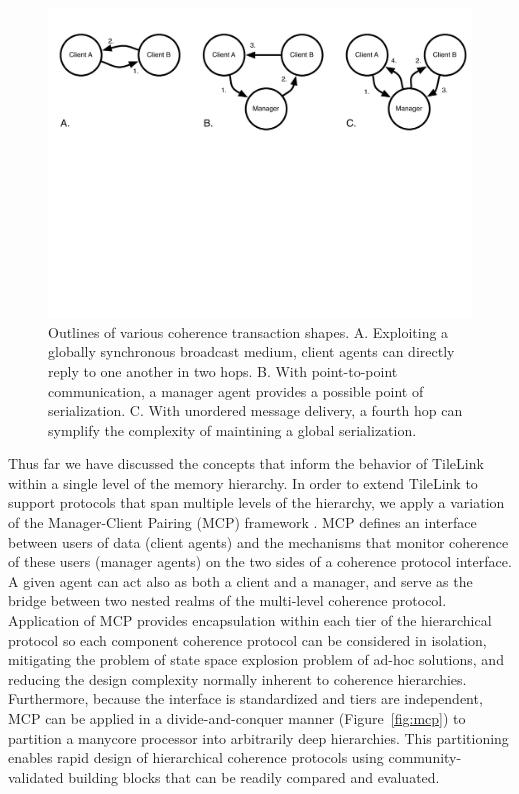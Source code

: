 \begin{figure}[t!]
\centering
\includegraphics[width=1\columnwidth]{tilelink/figures/hops.pdf}
\caption{Outlines of various coherence transaction shapes.
A. Exploiting a globally synchronous broadcast medium, client agents can directly reply to one another in two hops.
B. With point-to-point communication, a manager agent provides a possible point of serialization.
C. With unordered message delivery, a fourth hop can symplify the complexity of maintining a global serialization.
}
\label{fig:hops}
\end{figure}

Thus far we have discussed the concepts that inform the behavior of TileLink within a single level of the memory hierarchy.
In order to extend TileLink to support protocols that span multiple levels of the hierarchy, we apply a variation of the Manager-Client Pairing (MCP) framework \cite{beu2011manager}.
MCP defines an interface between users of data (client agents) and the mechanisms that monitor coherence of these users (manager agents) on the two sides of a coherence protocol interface.
A given agent can act also as both a client and a manager, and serve as the bridge between two nested realms of the multi-level coherence protocol.
Application of MCP provides
encapsulation within each tier of the hierarchical protocol so each
component coherence protocol can be considered in isolation,
mitigating the problem of state space explosion problem of ad-hoc
solutions, and reducing the design complexity normally inherent
to coherence hierarchies. Furthermore, because the interface is
standardized and tiers are independent, MCP can be applied in a
divide-and-conquer manner (Figure~\ref{fig:mcp}) to partition a manycore
processor into arbitrarily deep hierarchies. This partitioning enables rapid
design of hierarchical coherence protocols using community-validated
building blocks that can be readily compared and evaluated. 


